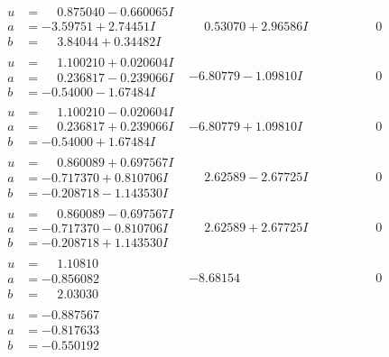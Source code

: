 \documentclass[1p]{elsarticle_modified}
\theoremstyle{definition}
\begin{document}
$$\begin{array}{c|c|c}
\begin{aligned}
u &= \phantom{-}0.875040 - 0.660065 I \\
a &= -3.59751 + 2.74451 I \\
b &= \phantom{-}3.84044 + 0.34482 I\end{aligned}
 & \phantom{-}0.53070 + 2.96586 I & \phantom{-0.000000 } 0 \\ \hline\begin{aligned}
u &= \phantom{-}1.100210 + 0.020604 I \\
a &= \phantom{-}0.236817 - 0.239066 I \\
b &= -0.54000 - 1.67484 I\end{aligned}
 & -6.80779 - 1.09810 I & \phantom{-0.000000 } 0 \\ \hline\begin{aligned}
u &= \phantom{-}1.100210 - 0.020604 I \\
a &= \phantom{-}0.236817 + 0.239066 I \\
b &= -0.54000 + 1.67484 I\end{aligned}
 & -6.80779 + 1.09810 I & \phantom{-0.000000 } 0 \\ \hline\begin{aligned}
u &= \phantom{-}0.860089 + 0.697567 I \\
a &= -0.717370 + 0.810706 I \\
b &= -0.208718 - 1.143530 I\end{aligned}
 & \phantom{-}2.62589 - 2.67725 I & \phantom{-0.000000 } 0 \\ \hline\begin{aligned}
u &= \phantom{-}0.860089 - 0.697567 I \\
a &= -0.717370 - 0.810706 I \\
b &= -0.208718 + 1.143530 I\end{aligned}
 & \phantom{-}2.62589 + 2.67725 I & \phantom{-0.000000 } 0 \\ \hline\begin{aligned}
u &= \phantom{-}1.10810\phantom{ +0.000000I} \\
a &= -0.856082\phantom{ +0.000000I} \\
b &= \phantom{-}2.03030\phantom{ +0.000000I}\end{aligned}
 & -8.68154\phantom{ +0.000000I} & \phantom{-0.000000 } 0 \\ \hline\begin{aligned}
u &= -0.887567\phantom{ +0.000000I} \\
a &= -0.817633\phantom{ +0.000000I} \\
b &= -0.550192\phantom{ +0.000000I}\end{aligned}

\end{array}$$
\end{document}
